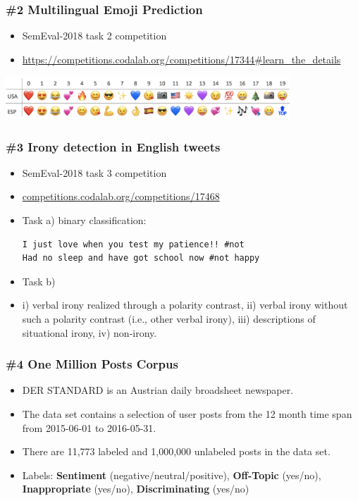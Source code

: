 \documentclass{beamer}
\begin{document}
\begin{frame}[fragile]
\frametitle{\#2 Multilingual Emoji Prediction}
  \begin{itemize}
    \item SemEval-2018 task 2 competition
  	\item \url{https://competitions.codalab.org/competitions/17344#learn_the_details}  	
  \end{itemize}
  \includegraphics[width=0.8\textwidth]{semeval}
\end{frame}

\begin{frame}[fragile]
\frametitle{\#3 Irony detection in English tweets}
  \begin{itemize}
	\item SemEval-2018 task 3 competition
	\item \url{competitions.codalab.org/competitions/17468}
    \item Task a) binary classification:
    
\begin{verbatim} 
I just love when you test my patience!! #not
Had no sleep and have got school now #not happy
\end{verbatim}
	
	\item Task b)
	\item i) verbal irony realized through a polarity contrast, ii) verbal irony without such a polarity contrast (i.e., other verbal irony), iii) descriptions of situational irony, iv) non-irony. 
  \end{itemize}
\end{frame}

\begin{frame}[fragile]
\frametitle{\#4 One Million Posts Corpus}
  \begin{itemize}
\item DER STANDARD is an Austrian daily broadsheet newspaper. 
\item The data set contains a selection of user posts from the 12 month time span from 2015-06-01 to 2016-05-31. 
\item There are 11,773 labeled and 1,000,000 unlabeled posts in the data set.
\item Labels: \textbf{Sentiment} (negative/neutral/positive), \textbf{Off-Topic} (yes/no), \textbf{Inappropriate} (yes/no), \textbf{Discriminating} (yes/no)
  \end{itemize}

\end{frame}
\end{document}
